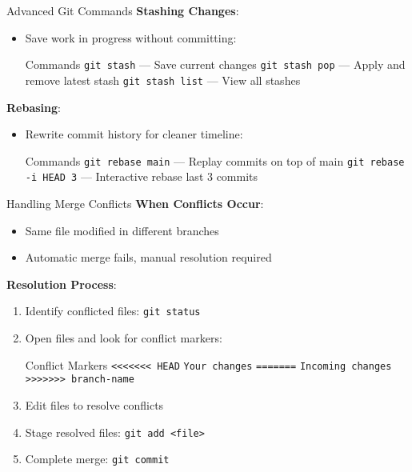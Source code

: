 \documentclass{beamer}
\begin{document}
\begin{frame}{Advanced Git Commands}
  \textbf{Stashing Changes}:
  \begin{itemize}
    \item Save work in progress without committing:
    \begin{block}{Commands}
      \texttt{git stash} --- Save current changes\newline
      \texttt{git stash pop} --- Apply and remove latest stash\newline
      \texttt{git stash list} --- View all stashes
    \end{block}
  \end{itemize}
  
  \textbf{Rebasing}:
  \begin{itemize}
    \item Rewrite commit history for cleaner timeline:
    \begin{block}{Commands}
      \texttt{git rebase main} --- Replay commits on top of main\newline
      \texttt{git rebase -i HEAD~3} --- Interactive rebase last 3 commits
    \end{block}
  \end{itemize}
\end{frame}

\begin{frame}{Handling Merge Conflicts}
  \textbf{When Conflicts Occur}:
  \begin{itemize}
    \item Same file modified in different branches
    \item Automatic merge fails, manual resolution required
  \end{itemize}
  
  \textbf{Resolution Process}:
  \begin{enumerate}
    \item Identify conflicted files: \texttt{git status}
    \item Open files and look for conflict markers:
    \begin{block}{Conflict Markers}
      \texttt{<<<<<<< HEAD}\newline
      \texttt{Your changes}\newline
      \texttt{=======}\newline
      \texttt{Incoming changes}\newline
      \texttt{>>>>>>> branch-name}
    \end{block}
    \item Edit files to resolve conflicts
    \item Stage resolved files: \texttt{git add <file>}
    \item Complete merge: \texttt{git commit}
  \end{enumerate}
\end{frame}
\end{document}
